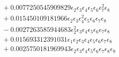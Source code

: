 \documentclass[10pt]{article}
\begin{document}
\begin{align*}
&{}  + 0.0077250545909829 \epsilon_{2} \epsilon_{3} \epsilon_{4} \epsilon_{5} \epsilon_{6} \epsilon_{7}^{2} \epsilon_{8} \\
&{}  + 0.015450109181966 \epsilon_{2} \epsilon_{3} \epsilon_{4}^{2} \epsilon_{5} \epsilon_{6} \epsilon_{7} \epsilon_{8} \\
&{}  - 0.0027263585944683 \epsilon_{2}^{2} \epsilon_{3} \epsilon_{4} \epsilon_{5} \epsilon_{6} \epsilon_{7} \epsilon_{8} \\
&{}  + 0.015693312391031 \epsilon_{1} \epsilon_{2} \epsilon_{3} \epsilon_{4} \epsilon_{5} \epsilon_{6} \epsilon_{7} \epsilon_{8} \\
&{}  + 0.0025750181969943 \epsilon_{2} \epsilon_{3} \epsilon_{4} \epsilon_{5} \epsilon_{6} \epsilon_{7} \epsilon_{8} \epsilon_{9}
\end{align*}
\end{document}
